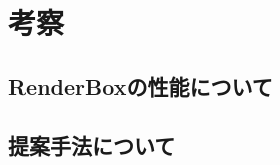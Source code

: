 \chapter{考察}
\label{chap:考察}

\section{RenderBoxの性能について}
\label{sec:RenderBoxの性能について}


\section{提案手法について}
\label{sec:提案手法について}


